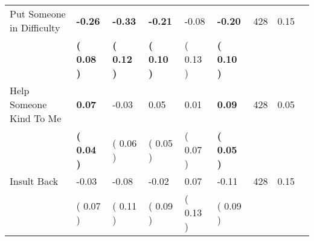 \begin{tabular}{L{6.2cm} C{1.8cm} C{1.8cm} C{1.8cm} C{1.8cm} C{1.8cm} C{1.8cm} C{0.3cm} C{0.3cm}}
Put Someone in Difficulty & \textbf{    -0.26} & \textbf{    -0.33} & \textbf{    -0.21} &     -0.08 & \textbf{    -0.20}  & 428 &       0.15 \\ 
 & \textbf{(     0.08 )} & \textbf{(     0.12 )} & \textbf{(     0.10 )} & (     0.13 ) & \textbf{(     0.10 )}  & \\
Help Someone Kind To Me & \textbf{     0.07} &     -0.03 &      0.05 &      0.01 & \textbf{     0.09}  & 428 &       0.05 \\ 
 & \textbf{(     0.04 )} & (     0.06 ) & (     0.05 ) & (     0.07 ) & \textbf{(     0.05 )}  & \\
Insult Back &     -0.03 &     -0.08 &     -0.02 &      0.07 &     -0.11  & 428 &       0.15 \\ 
 & (     0.07 ) & (     0.11 ) & (     0.09 ) & (     0.13 ) & (     0.09 )  & \\
\bottomrule
\end{tabular}
